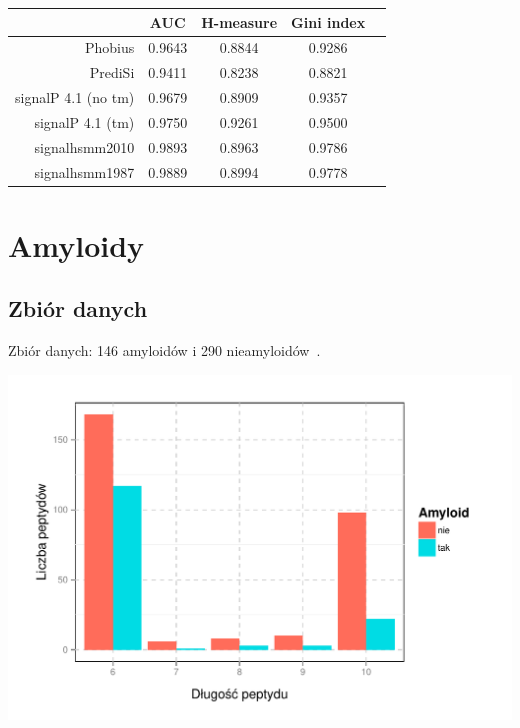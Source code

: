 \documentclass[10pt]{beamer}\usepackage[]{graphicx}\usepackage[]{color}
\makeatletter
\def\maxwidth{ %
  \ifdim\Gin@nat@width>\linewidth
    \linewidth
  \else
    \Gin@nat@width
  \fi
}
\makeatother
\begin{document}
    \begin{frame}
      \begin{table}[ht]
\centering
\begin{tabular}{rcccc}
  \hline
 & AUC & H-measure & Gini index\\ 
  \hline
Phobius & 0.9643 & 0.8844 & 0.9286\\ 
  PrediSi & 0.9411 & 0.8238 & 0.8821\\ 
  signalP 4.1 (no tm) & 0.9679 & 0.8909 & 0.9357\\ 
  signalP 4.1 (tm) & 0.9750 & 0.9261 & 0.9500\\ 
  signalhsmm2010 & 0.9893 & 0.8963 & 0.9786\\ 
  signalhsmm1987 & 0.9889 & 0.8994 & 0.9778\\ 
   \hline
\end{tabular}
\end{table}
    \end{frame}


\section{Amyloidy}

\subsection{Zbiór danych}

\begin{frame}

Zbiór danych: 146 amyloidów i 290 nieamyloidów~\citep{kotulska2014}.


\includegraphics[width=\maxwidth]{figure/unnamed-chunk-11-1} 



\end{frame}

\begin{frame}

\tiny{
      
      
    }


\end{frame}
\end{document}
